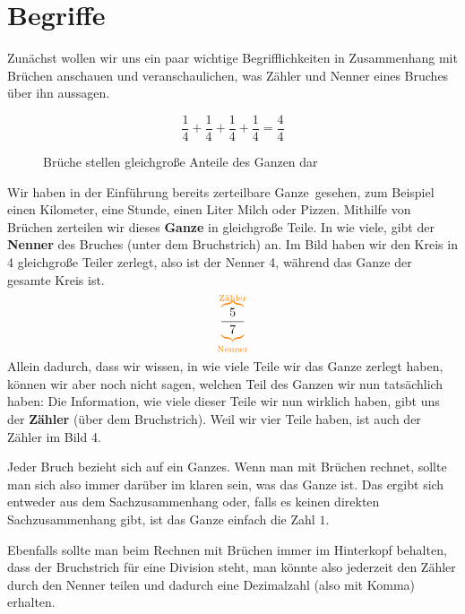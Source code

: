 \documentclass[../../main]{subfiles}
\begin{document}
\section{Begriffe}
Zunächst wollen wir uns ein paar wichtige Begrifflichkeiten in Zusammenhang mit Brüchen anschauen und veranschaulichen, was Zähler und Nenner eines Bruches über ihn aussagen.
\begin{figure}[hbt]
    \centering
    
    \[\frac{1}{4}+\frac{1}{4}+\frac{1}{4}+\frac{1}{4}=\frac{4}{4}\]
    
    \caption{Brüche stellen gleichgroße Anteile des Ganzen dar}
    \label{fig:fractions}
\end{figure}
Wir haben in der Einführung bereits zerteilbare \glqq Ganze\grqq~gesehen, zum Beispiel einen Kilometer, eine Stunde, einen Liter Milch oder Pizzen. Mithilfe von Brüchen zerteilen wir dieses \textbf{Ganze} in gleichgroße Teile. In wie viele, gibt der \textbf{Nenner} des Bruches (unter dem Bruchstrich) an. Im Bild haben wir den Kreis in 4 gleichgroße Teiler zerlegt, also ist der Nenner 4, während das Ganze der gesamte Kreis ist.
\[\frac{\colorobrace{5}{\text{Zähler}}}{\colorbrace{7}{\text{Nenner}}}\]
Allein dadurch, dass wir wissen, in wie viele Teile wir das Ganze zerlegt haben, können wir aber noch nicht sagen, welchen Teil des Ganzen wir nun tatsächlich haben: Die Information, wie viele dieser Teile wir nun wirklich haben, gibt uns der \textbf{Zähler} (über dem Bruchstrich). Weil wir vier Teile haben, ist auch der Zähler im Bild 4.

Jeder Bruch bezieht sich auf ein Ganzes. Wenn man mit Brüchen rechnet, sollte man sich also immer darüber im klaren sein, was das Ganze ist. Das ergibt sich entweder aus dem Sachzusammenhang oder, falls es keinen direkten Sachzusammenhang gibt, ist das Ganze einfach die Zahl $1$.

Ebenfalls sollte man beim Rechnen mit Brüchen immer im Hinterkopf behalten, dass der Bruchstrich für eine Division steht, man könnte also jederzeit den Zähler durch den Nenner teilen und dadurch eine Dezimalzahl (also mit Komma) erhalten.
\end{document}
